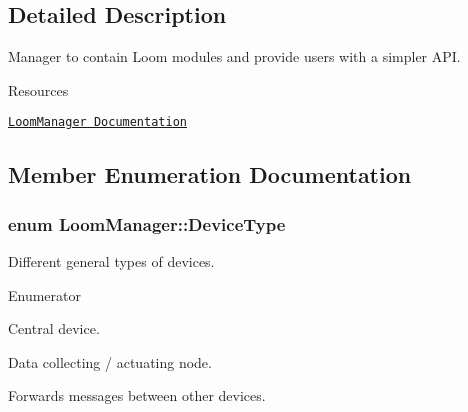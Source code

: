 \subsection{Detailed Description}
Manager to contain Loom modules and provide users with a simpler A\+PI. 

\begin{DoxyParagraph}{Resources}

\begin{DoxyItemize}
\item \href{https://openslab-osu.github.io/Loom/html/class_loom_manager.html}{\tt Loom\+Manager Documentation} 
\end{DoxyItemize}
\end{DoxyParagraph}


\subsection{Member Enumeration Documentation}
\subsubsection[{\texorpdfstring{Device\+Type}{DeviceType}}]{\setlength{\rightskip}{0pt plus 5cm}enum {\bf Loom\+Manager\+::\+Device\+Type}\hspace{0.3cm}{\ttfamily [strong]}}\hypertarget{class_loom_manager_a23170d165993ad196a7604fd08b29400}{}\label{class_loom_manager_a23170d165993ad196a7604fd08b29400}


Different general types of devices. 

\begin{Desc}
\item[Enumerator]\par
\begin{description}
\item[{\em 
H\+UB\hypertarget{class_loom_manager_a23170d165993ad196a7604fd08b29400a3cc0a3bb62454e5f6414c7adb897b5ff}{}\label{class_loom_manager_a23170d165993ad196a7604fd08b29400a3cc0a3bb62454e5f6414c7adb897b5ff}
}]Central device. \item[{\em 
N\+O\+DE\hypertarget{class_loom_manager_a23170d165993ad196a7604fd08b29400a0cc25b606fe928a0c9a58f7f209c4495}{}\label{class_loom_manager_a23170d165993ad196a7604fd08b29400a0cc25b606fe928a0c9a58f7f209c4495}
}]Data collecting / actuating node. \item[{\em 
R\+E\+P\+E\+A\+T\+ER\hypertarget{class_loom_manager_a23170d165993ad196a7604fd08b29400ad31b9025a6321e1dddf76266123d7e99}{}\label{class_loom_manager_a23170d165993ad196a7604fd08b29400ad31b9025a6321e1dddf76266123d7e99}
}]Forwards messages between other devices. \end{description}
\end{Desc}


